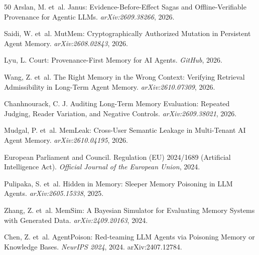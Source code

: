 \documentclass{article}
\begin{document}
\begin{thebibliography}{50}
Arslan, M. et~al.
\newblock Janus: Evidence-Before-Effect Sagas and Offline-Verifiable Provenance for Agentic LLMs.
\newblock \emph{arXiv:2609.38266}, 2026.

Saidi, W. et~al.
\newblock MutMem: Cryptographically Authorized Mutation in Persistent Agent Memory.
\newblock \emph{arXiv:2608.02843}, 2026.

Lyu, L.
\newblock Court: Provenance-First Memory for AI Agents.
\newblock \emph{GitHub}, 2026.

Wang, Z. et~al.
\newblock The Right Memory in the Wrong Context: Verifying Retrieval Admissibility in Long-Term Agent Memory.
\newblock \emph{arXiv:2610.07309}, 2026.

Chanhnourack, C. J.
\newblock Auditing Long-Term Memory Evaluation: Repeated Judging, Reader Variation, and Negative Controls.
\newblock \emph{arXiv:2609.38021}, 2026.

Mudgal, P. et~al.
\newblock MemLeak: Cross-User Semantic Leakage in Multi-Tenant AI Agent Memory.
\newblock \emph{arXiv:2610.04195}, 2026.

European Parliament and Council.
\newblock Regulation (EU) 2024/1689 (Artificial Intelligence Act).
\newblock \emph{Official Journal of the European Union}, 2024.


Pulipaka, S. et~al.
\newblock Hidden in Memory: Sleeper Memory Poisoning in LLM Agents. \newblock \emph{arXiv:2605.15338}, 2025.

Zhang, Z. et~al.
\newblock MemSim: A Bayesian Simulator for Evaluating Memory Systems with Generated Data.
\newblock \emph{arXiv:2409.20163}, 2024.

Chen, Z. et~al.
\newblock AgentPoison: Red-teaming LLM Agents via Poisoning Memory or Knowledge Bases.
\newblock \emph{NeurIPS 2024}, 2024. arXiv:2407.12784.

\end{thebibliography}
\end{document}
